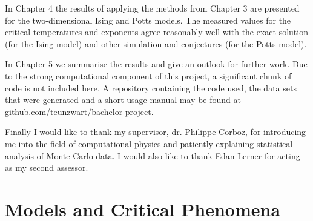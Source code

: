 \documentclass[11pt, a4paper]{report} %
\begin{document}
In Chapter 4 the results of applying the methods from Chapter 3 are presented for the two-dimensional Ising and Potts models.
The measured values for the critical temperatures and exponents agree reasonably well with the exact solution (for the Ising model) and other simulation and conjectures (for the Potts model).

In Chapter 5 we summarise the results and give an outlook for further work.
Due to the strong computational component of this project, a significant chunk of code is not included here.
A repository containing the code used, the data sets that were generated and a short usage manual may be found at \url{github.com/teunzwart/bachelor-project}.

Finally I would like to thank my supervisor, dr. Philippe Corboz, for introducing me into the field of computational physics and patiently explaining statistical analysis of Monte Carlo data.
I would also like to thank Edan Lerner for acting as my second assessor.

\chapter{Models and Critical Phenomena}
\end{document}
